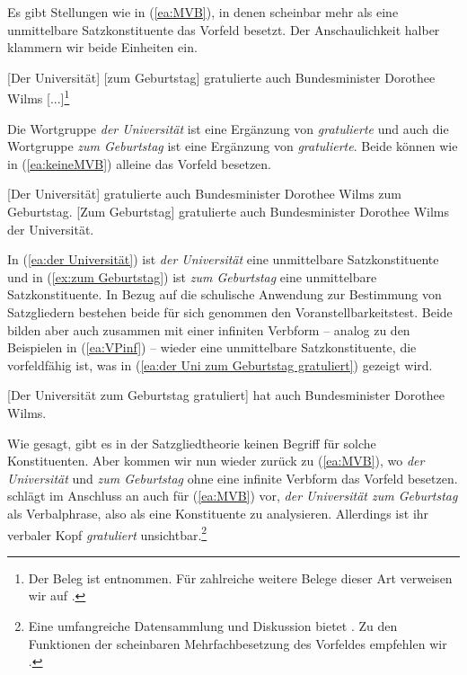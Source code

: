 Es gibt Stellungen wie in (\ref{ea:MVB}), in denen scheinbar mehr als eine unmittelbare Satzkonstituente das Vorfeld besetzt. Der Anschaulichkeit halber klammern wir beide Einheiten ein. 

\ea \label{ea:MVB} [Der Universität] [zum Geburtstag] gratulierte auch Bundesminister Dorothee Wilms [...]\footnote{Der Beleg ist \citet[87]{Duerscheid1989} entnommen. Für zahlreiche weitere Belege dieser Art verweisen wir auf \citet{Mueller2003}.}
\z 

Die Wortgruppe \textit{der Universität} ist eine Ergänzung von \textit{gratulierte} und auch die Wortgruppe \textit{zum Geburtstag} ist eine Ergänzung von \textit{gratulierte}. Beide können wie in (\ref{ea:keineMVB}) alleine das Vorfeld besetzen.

\ea \label{ea:keineMVB}
\ea\label{ea:der Universität} [Der Universität] gratulierte auch Bundesminister Dorothee Wilms zum Geburtstag.
\ex \label{ex:zum Geburtstag} [Zum Geburtstag] gratulierte auch Bundesminister Dorothee Wilms der Universität. 
\z 
\z 

In (\ref{ea:der Universität}) ist \textit{der Universität} eine unmittelbare Satzkonstituente und in (\ref{ex:zum Geburtstag}) ist \textit{zum Geburtstag} eine unmittelbare Satzkonstituente. In Bezug auf die schulische Anwendung zur Bestimmung von Satzgliedern bestehen beide für sich genommen den Voranstellbarkeitstest. Beide bilden aber auch zusammen mit einer infiniten Verbform -- analog zu den Beispielen in (\ref{ea:VPinf}) -- wieder eine unmittelbare Satzkonstituente, die vorfeldfähig ist, was in (\ref{ea:der Uni zum Geburtstag gratuliert}) gezeigt wird.

\ea \label{ea:der Uni zum Geburtstag gratuliert} [Der Universität zum Geburtstag gratuliert] hat auch Bundesminister Dorothee Wilms.
\z 

Wie gesagt, gibt es in der Satzgliedtheorie keinen Begriff für solche Konstituenten. Aber kommen wir nun wieder zurück zu (\ref{ea:MVB}), wo \textit{der Universität} und \textit{zum Geburtstag} ohne eine infinite Verbform das Vorfeld besetzen. \citet[312--321]{Mueller2005} schlägt im Anschluss an \citet{Fanselow1993} auch für (\ref{ea:MVB}) vor, \textit{der Universität zum Geburtstag} als Verbalphrase, also als eine Konstituente zu analysieren. Allerdings ist ihr verbaler Kopf \textit{gratuliert} unsichtbar.\footnote{Eine umfangreiche Datensammlung und Diskussion bietet \citet{Mueller2003}. Zu den Funktionen der scheinbaren Mehrfachbesetzung des Vorfeldes empfehlen wir \citet{MuellerBildhauerCook2012}.} 

